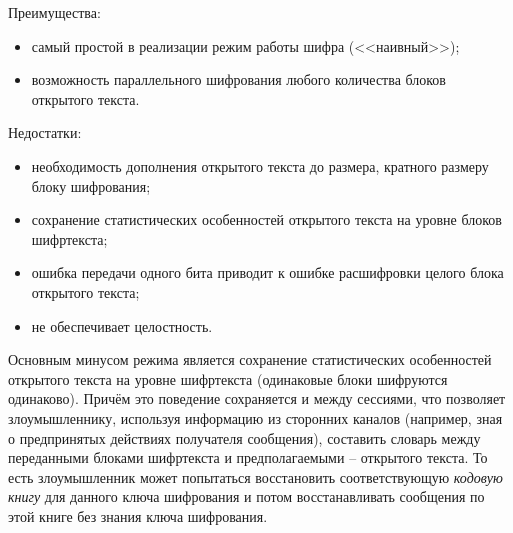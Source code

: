 

Преимущества:
\begin{itemize}
	\item самый простой в реализации режим работы шифра (<<наивный>>);
	\item возможность параллельного шифрования любого количества блоков открытого текста.
\end{itemize}

Недостатки:
\begin{itemize}
	\item необходимость дополнения открытого текста до размера, кратного размеру блоку шифрования;
	\item сохранение статистических особенностей открытого текста на уровне блоков шифртекста;
	\item ошибка передачи одного бита приводит к ошибке расшифровки целого блока открытого текста;
	\item не обеспечивает целостность.
\end{itemize}

Основным минусом режима является сохранение статистических особенностей открытого текста на уровне шифртекста (одинаковые блоки шифруются одинаково). Причём это поведение сохраняется и между сессиями, что позволяет злоумышленнику, используя информацию из сторонних каналов (например, зная о предпринятых действиях получателя сообщения), составить словарь между переданными блоками шифртекста и предполагаемыми -- открытого текста. То есть злоумышленник может попытаться восстановить соответствующую \emph{кодовую книгу} для данного ключа шифрования и потом восстанавливать сообщения по этой книге без знания ключа шифрования.

